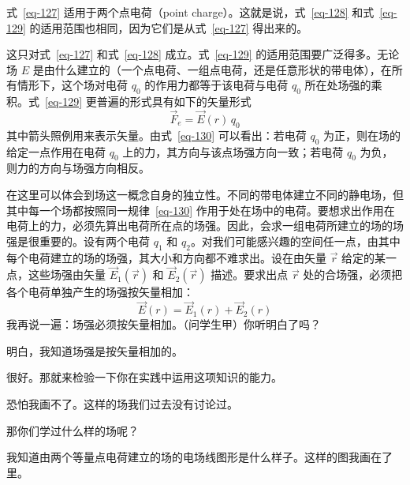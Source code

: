 \begin{dialogue}
\stdb 式~\eqref{eq-127} 适用于两个点电荷（point charge）。这就是说，式~\eqref{eq-128} 和式~\eqref{eq-129} 的适用范围也相同，因为它们是从式~\eqref{eq-127} 得出来的。

\tchr 这只对式~\eqref{eq-127} 和式~\eqref{eq-128} 成立。式~\eqref{eq-129} 的适用范围要广泛得多。无论场 $E$ 是由什么建立的（一个点电荷、一组点电荷，还是任意形状的带电体），在所有情形下，这个场对电荷 $q_{0}$ 的作用力都等于该电荷与电荷 $q_{0}$ 所在处场强的乘积。式~\eqref{eq-129} 更普遍的形式具有如下的矢量形式
\begin{equation}%
\vec{F}_{e} = \vec{E}(r) \, q_{0}
\label{eq-130}
\end{equation}
其中箭头照例用来表示矢量。由式~\eqref{eq-130} 可以看出：若电荷 $q_{0}$ 为正，则在场的给定一点作用在电荷 $q_{0}$ 上的力，其方向与该点场强方向一致；若电荷 $q_{0}$ 为负，则力的方向与场强方向相反。

在这里可以体会到场这一概念自身的独立性。不同的带电体建立不同的静电场，但其中每一个场都按照同一规律~\eqref{eq-130} 作用于处在场中的电荷。要想求出作用在电荷上的力，必须先算出电荷所在点的场强。因此，会求一组电荷所建立的场的场强是很重要的。设有两个电荷 $q_{1}$ 和 $q_{2}$。对我们可能感兴趣的空间任一点，由其中每个电荷建立的场的场强，其大小和方向都不难求出。设在由矢量 $\vec{r}$ 给定的某一点，这些场强由矢量 $\vec{E}_{1}(\vec{r})$ 和 $\vec{E}_{2}(\vec{r})$ 描述。要求出点 $\vec{r}$ 处的合场强，必须把各个电荷单独产生的场强按矢量相加：
\begin{equation}%
\vec{E}(r) = \vec{E}_{1}(r) + \vec{E}_{2}(r)
\label{eq-131}
\end{equation}
我再说一遍：场强必须按矢量相加。（问学生甲）你听明白了吗？

\stda 明白，我知道场强是按矢量相加的。

\tchr 很好。那就来检验一下你在实践中运用这项知识的能力。

\stda 恐怕我画不了。这样的场我们过去没有讨论过。

\tchr 那你们学过什么样的场呢？

\stda 我知道由两个等量点电荷建立的场的电场线图形是什么样子。这样的图我画在了 里。


\end{dialogue}
